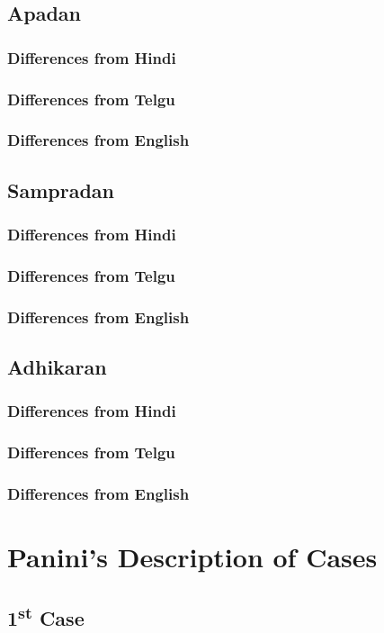 \documentclass[a4paper,10pt]{article}
\begin{document}
\subsection{Apadan}
\subsubsection{Differences from Hindi}
\subsubsection{Differences from Telgu}
\subsubsection{Differences from English}
\subsection{Sampradan}
\subsubsection{Differences from Hindi}
\subsubsection{Differences from Telgu}
\subsubsection{Differences from English}
\subsection{Adhikaran}
\subsubsection{Differences from Hindi}
\subsubsection{Differences from Telgu}
\subsubsection{Differences from English}
\section{Panini's Description of Cases}
\subsection{1\textsuperscript{st} Case}
\end{document}
